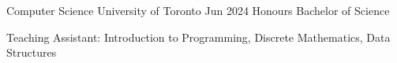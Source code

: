 
\begin{cventries}
  \cventry
    {Computer Science}
    {University of Toronto}
    {}
    {Jun 2024}
    {Honours Bachelor of Science}
    {
      \begin{cvitems}
        \item {Teaching Assistant: Introduction to Programming, Discrete Mathematics, Data Structures}
      \end{cvitems}
    }
\end{cventries}
